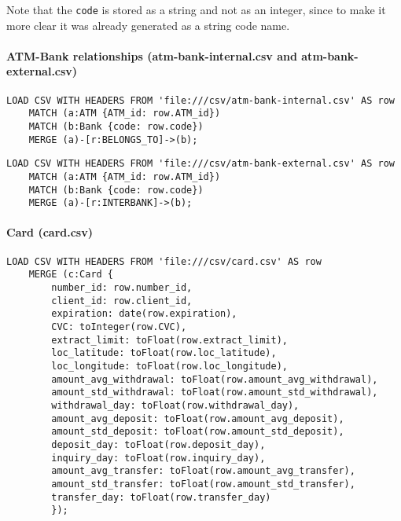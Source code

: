{Note that the \texttt{code} is stored as a string and not as an integer, since to make it more clear it 
was already generated as a string code name.

\paragraph{ATM-Bank relationships (atm-bank-internal.csv and atm-bank-external.csv)}

\begin{center}
\lstset{style=cypherStyle}
\begin{lstlisting}[caption={atm-bank-internal.csv}]
    LOAD CSV WITH HEADERS FROM 'file:///csv/atm-bank-internal.csv' AS row
    MATCH (a:ATM {ATM_id: row.ATM_id})
    MATCH (b:Bank {code: row.code})
    MERGE (a)-[r:BELONGS_TO]->(b);
\end{lstlisting}
\end{center}

\begin{center}
\lstset{style=cypherStyle}
\begin{lstlisting}[caption={atm-bank-external.csv}]
    LOAD CSV WITH HEADERS FROM 'file:///csv/atm-bank-external.csv' AS row
    MATCH (a:ATM {ATM_id: row.ATM_id})
    MATCH (b:Bank {code: row.code})
    MERGE (a)-[r:INTERBANK]->(b);
\end{lstlisting}
\end{center}

\paragraph{Card (card.csv)}

\begin{center}
\lstset{style=cypherStyle}
\begin{lstlisting}[caption={card.csv}]
    LOAD CSV WITH HEADERS FROM 'file:///csv/card.csv' AS row
	MERGE (c:Card {
		number_id: row.number_id, 
		client_id: row.client_id, 
		expiration: date(row.expiration), 
		CVC: toInteger(row.CVC), 
		extract_limit: toFloat(row.extract_limit), 
		loc_latitude: toFloat(row.loc_latitude), 
		loc_longitude: toFloat(row.loc_longitude),
		amount_avg_withdrawal: toFloat(row.amount_avg_withdrawal),
		amount_std_withdrawal: toFloat(row.amount_std_withdrawal),
		withdrawal_day: toFloat(row.withdrawal_day),
		amount_avg_deposit: toFloat(row.amount_avg_deposit),
		amount_std_deposit: toFloat(row.amount_std_deposit),
		deposit_day: toFloat(row.deposit_day),
		inquiry_day: toFloat(row.inquiry_day),
		amount_avg_transfer: toFloat(row.amount_avg_transfer),
		amount_std_transfer: toFloat(row.amount_std_transfer),
		transfer_day: toFloat(row.transfer_day)
		});
\end{lstlisting}
\end{center}

}

